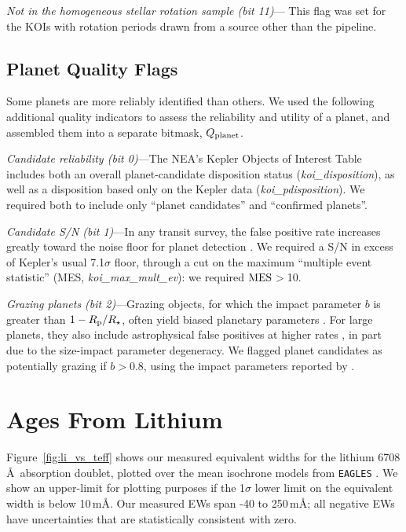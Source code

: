 \documentclass[11pt,twocolumn,tighten,linenumbers]{aastex63}
\begin{document}
{\it Not in the homogeneous stellar rotation sample (bit 11)}--- This
flag was set for the KOIs with rotation periods drawn from a source
other than the \citeauthor{Santos_2019} pipeline.




\subsection{Planet Quality Flags} \label{subsec:plflags} Some planets
are more reliably identified than others.  We used the following
additional quality indicators to assess the reliability and utility of
a planet, and assembled them into a separate bitmask, $Q_{\rm
planet}$.

{\it Candidate reliability (bit 0)}---The NEA's Kepler Objects of
Interest Table includes both an overall planet-candidate disposition
status ({\it koi\_disposition}), as well as a disposition based only
on the Kepler data ({\it koi\_pdisposition}).  We required both to
include only ``planet candidates'' and ``confirmed planets''. 

{\it Candidate S/N (bit 1)}---In any transit survey, the false
positive rate increases greatly toward the noise floor for planet
detection \citep[e.g.][]{2002ApJ...564..495J}.  We required a S/N in
excess of Kepler's usual 7.1$\sigma$ floor, through a cut on the
maximum ``multiple event statistic'' (MES, {\it koi\_max\_mult\_ev}):
we required ${\rm MES}$$>$10.

{\it Grazing planets (bit 2)}---Grazing objects, for which the impact
parameter $b$ is greater than $1-R_{\rm p}/R_\star$, often yield
biased planetary parameters \citep[e.g.][]{2022AJ....163..111G}.  For
large planets, they also include astrophysical false positives at
higher rates \citep{2016ApJ...822...86M}, in part due to the
size-impact parameter degeneracy.  We flagged planet candidates as
potentially grazing if $b$$>$0.8, using the impact parameters reported
by \citet{Thompson_2018}.




\section{Ages From Lithium}
\label{sec:liage} 

Figure~\ref{fig:li_vs_teff} shows our measured equivalent widths for
the lithium 6708\,\AA\ absorption doublet, plotted over the mean
isochrone models from \texttt{EAGLES} \citep{Jeffries_2023}.  We
show an upper-limit for plotting purposes if the 1$\sigma$ lower
limit on the equivalent width is below 10\,m\AA.  Our measured EWs
span -40 to 250\,m\AA; all negative EWs have uncertainties that are
statistically consistent with zero.
\end{document}
